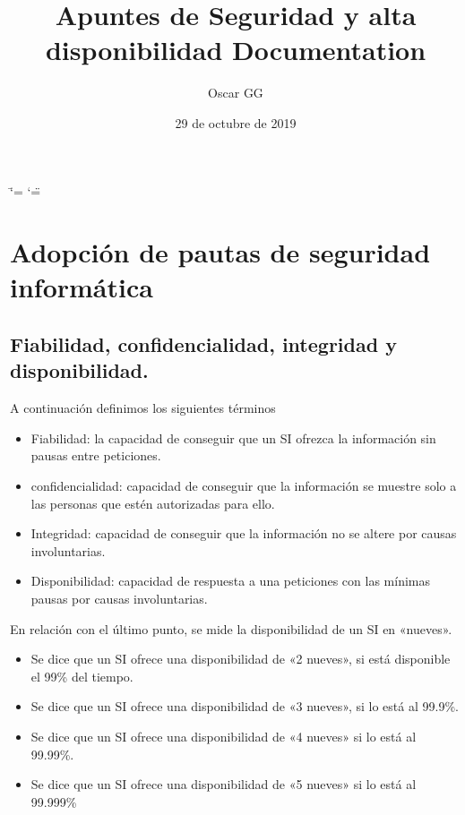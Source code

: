 \documentclass[letterpaper,10pt,spanish]{sphinxmanual}
\title{Apuntes de Seguridad y alta disponibilidad Documentation}
\date{29 de octubre de 2019}
\author{Oscar GG}
\begin{document}
\ifdefined\shorthandoff
  \ifnum\catcode`\=\string=\active\shorthandoff{=}\fi
  \ifnum\catcode`\"=\active{}\fi
\fi

\pagestyle{empty}
\sphinxmaketitle
\pagestyle{plain}
\sphinxtableofcontents
\pagestyle{normal}
\label{\detokenize{index::doc}}



\chapter{Adopción de pautas de seguridad informática}
\label{\detokenize{tema_pautas_seguridad_informatica/tema_pautas_seguridad_informatica:adopcion-de-pautas-de-seguridad-informatica}}\label{\detokenize{tema_pautas_seguridad_informatica/tema_pautas_seguridad_informatica::doc}}

\section{Fiabilidad, confidencialidad, integridad y disponibilidad.}
\label{\detokenize{tema_pautas_seguridad_informatica/tema_pautas_seguridad_informatica:fiabilidad-confidencialidad-integridad-y-disponibilidad}}
A continuación definimos los siguientes términos
\begin{itemize}
\item {} 
Fiabilidad: la capacidad de conseguir que un SI ofrezca la información sin pausas entre peticiones.

\item {} 
confidencialidad: capacidad de conseguir que la información se muestre solo a las personas que estén autorizadas para ello.

\item {} 
Integridad: capacidad de conseguir que la información no se altere por causas involuntarias.

\item {} 
Disponibilidad: capacidad de respuesta a una peticiones con las mínimas pausas por causas involuntarias.

\end{itemize}

En relación con el último punto, se mide la disponibilidad de un SI en «nueves».
\begin{itemize}
\item {} 
Se dice que un SI ofrece una disponibilidad de «2 nueves», si está disponible el 99\% del tiempo.

\item {} 
Se dice que un SI ofrece una disponibilidad de «3 nueves», si lo está al 99.9\%.

\item {} 
Se dice que un SI ofrece una disponibilidad de «4 nueves» si lo está al 99.99\%.

\item {} 
Se dice que un SI ofrece una disponibilidad de «5 nueves» si lo está al 99.999\%

\end{itemize}
\end{document}
